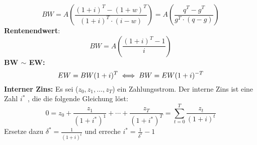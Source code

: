 \documentclass[leqno]{scrartcl}
\begin{document}
\begin{multicols}{4}
  \begin{equation*}
    BW = A  \left(\frac{(1+i)^T-(1+w)^T}{(1+i)^T \cdot (i-w)}\right)= A  \left(\frac{q^T-g^T}{g^T \cdot (q-g)}\right)
  \end{equation*}
\textbf{Rentenendwert}:\\
  \begin{equation*}
    BW = A  \left(\frac{(1+i)^T-1}{i}\right)
  \end{equation*}  
\textbf{BW $\sim$ EW:}
  \begin{equation*}\label{relation}
    EW = BW (1+i)^{T}  \iff BW = EW (1+i)^{-T} \\
  \end{equation*}
\textbf{Interner Zins:}\label{internerzins}
  Es sei ($z_0, z_1, \dots, z_T$) ein Zahlungsstrom. Der interne Zins ist eine Zahl $i^*$ , die 
  die folgende Gleichung löst:
  $$0 = z_0 + \frac{z_1}{(1+i^*)^1} + \cdots + \frac{z_T}{(1+i^*)^T} = \sum^T_{t=0}\frac{z_t}{(1+i)^t}$$
  Ersetze dazu $\delta^* = \frac{1}{(1+i)^t}$ und erreche $i^* = \frac{1}{\delta^*}-1$
  
  
  
  
  
  
  



\end{multicols}
\end{document}
